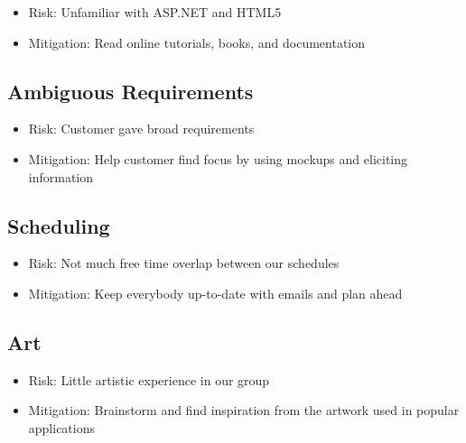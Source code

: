 \documentclass[11pt,a4paper,oneside]{article}
\begin{document}
\begin{itemize}
\item Risk: Unfamiliar with ASP.NET and HTML5 
\item Mitigation: Read online tutorials, books, and documentation
\end{itemize}


\subsection{Ambiguous Requirements}

\begin{itemize}
\item Risk: Customer gave broad requirements
\item Mitigation: Help customer find focus by using mockups and eliciting information
\end{itemize}


\subsection{Scheduling}

\begin{itemize}
\item Risk: Not much free time overlap between our schedules
\item Mitigation: Keep everybody up-to-date with emails and plan ahead
\end{itemize}


\subsection{Art}

\begin{itemize}
\item Risk: Little artistic experience in our group
\item Mitigation: Brainstorm and find inspiration from the artwork used in popular applications
\end{itemize}
\end{document}
